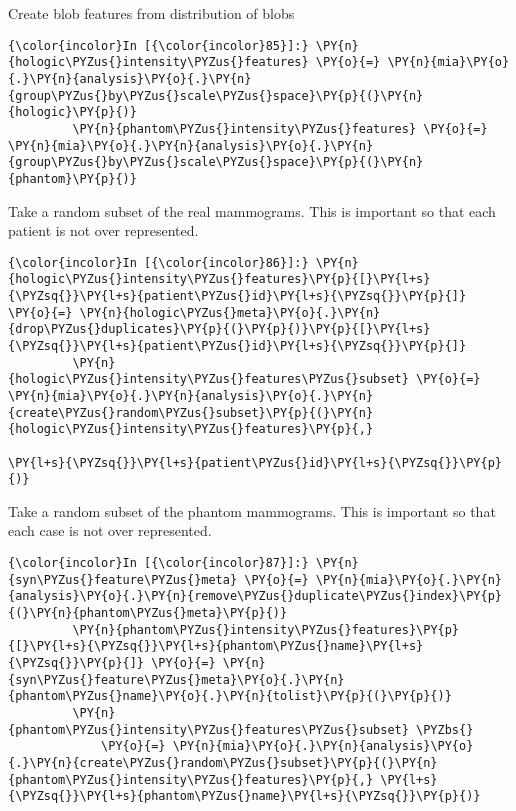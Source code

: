     Create blob features from distribution of blobs

    \begin{Verbatim}[commandchars=\\\{\}]
{\color{incolor}In [{\color{incolor}85}]:} \PY{n}{hologic\PYZus{}intensity\PYZus{}features} \PY{o}{=} \PY{n}{mia}\PY{o}{.}\PY{n}{analysis}\PY{o}{.}\PY{n}{group\PYZus{}by\PYZus{}scale\PYZus{}space}\PY{p}{(}\PY{n}{hologic}\PY{p}{)}
         \PY{n}{phantom\PYZus{}intensity\PYZus{}features} \PY{o}{=} \PY{n}{mia}\PY{o}{.}\PY{n}{analysis}\PY{o}{.}\PY{n}{group\PYZus{}by\PYZus{}scale\PYZus{}space}\PY{p}{(}\PY{n}{phantom}\PY{p}{)}
\end{Verbatim}

    Take a random subset of the real mammograms. This is important so that
each patient is not over represented.

    \begin{Verbatim}[commandchars=\\\{\}]
{\color{incolor}In [{\color{incolor}86}]:} \PY{n}{hologic\PYZus{}intensity\PYZus{}features}\PY{p}{[}\PY{l+s}{\PYZsq{}}\PY{l+s}{patient\PYZus{}id}\PY{l+s}{\PYZsq{}}\PY{p}{]} \PY{o}{=} \PY{n}{hologic\PYZus{}meta}\PY{o}{.}\PY{n}{drop\PYZus{}duplicates}\PY{p}{(}\PY{p}{)}\PY{p}{[}\PY{l+s}{\PYZsq{}}\PY{l+s}{patient\PYZus{}id}\PY{l+s}{\PYZsq{}}\PY{p}{]}
         \PY{n}{hologic\PYZus{}intensity\PYZus{}features\PYZus{}subset} \PY{o}{=} \PY{n}{mia}\PY{o}{.}\PY{n}{analysis}\PY{o}{.}\PY{n}{create\PYZus{}random\PYZus{}subset}\PY{p}{(}\PY{n}{hologic\PYZus{}intensity\PYZus{}features}\PY{p}{,}
                                                                               \PY{l+s}{\PYZsq{}}\PY{l+s}{patient\PYZus{}id}\PY{l+s}{\PYZsq{}}\PY{p}{)}
\end{Verbatim}

    Take a random subset of the phantom mammograms. This is important so
that each case is not over represented.

    \begin{Verbatim}[commandchars=\\\{\}]
{\color{incolor}In [{\color{incolor}87}]:} \PY{n}{syn\PYZus{}feature\PYZus{}meta} \PY{o}{=} \PY{n}{mia}\PY{o}{.}\PY{n}{analysis}\PY{o}{.}\PY{n}{remove\PYZus{}duplicate\PYZus{}index}\PY{p}{(}\PY{n}{phantom\PYZus{}meta}\PY{p}{)}
         \PY{n}{phantom\PYZus{}intensity\PYZus{}features}\PY{p}{[}\PY{l+s}{\PYZsq{}}\PY{l+s}{phantom\PYZus{}name}\PY{l+s}{\PYZsq{}}\PY{p}{]} \PY{o}{=} \PY{n}{syn\PYZus{}feature\PYZus{}meta}\PY{o}{.}\PY{n}{phantom\PYZus{}name}\PY{o}{.}\PY{n}{tolist}\PY{p}{(}\PY{p}{)}
         \PY{n}{phantom\PYZus{}intensity\PYZus{}features\PYZus{}subset} \PYZbs{}
             \PY{o}{=} \PY{n}{mia}\PY{o}{.}\PY{n}{analysis}\PY{o}{.}\PY{n}{create\PYZus{}random\PYZus{}subset}\PY{p}{(}\PY{n}{phantom\PYZus{}intensity\PYZus{}features}\PY{p}{,} \PY{l+s}{\PYZsq{}}\PY{l+s}{phantom\PYZus{}name}\PY{l+s}{\PYZsq{}}\PY{p}{)}
\end{Verbatim}

